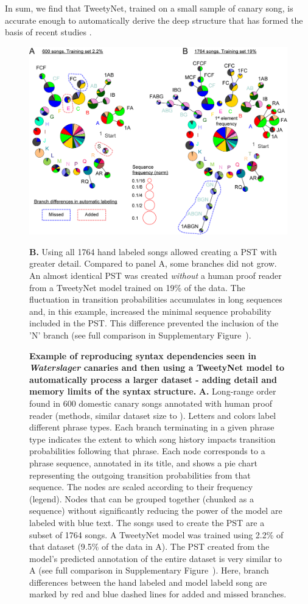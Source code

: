 \documentclass[10pt,letterpaper]{article}
\begin{document}
In sum, we find that TweetyNet, trained on a small sample of canary song, is accurate enough to automatically derive the deep structure that has formed the basis of recent studies \cite{markowitz_long-range_2013,cohen_hidden_2020}.


\begin{figure}[!ht]
\includegraphics[scale=0.85]{Figures/fig8/Figure8_v8.png}
\caption{{\bf Example of reproducing syntax dependencies seen in \textit{Waterslager} canaries and then using a TweetyNet model to automatically process a larger dataset - adding detail and memory limits of the syntax structure.}
\textbf{A.} Long-range order found in 600 domestic canary songs annotated with human proof reader (methods, similar dataset size to \cite{markowitz_long-range_2013}). Letters and colors label different phrase types. Each branch terminating in a given phrase type indicates the extent to which song history impacts transition probabilities following that phrase. Each node corresponds to a phrase sequence, annotated in its title, and shows a pie chart representing the outgoing transition probabilities from that sequence. The nodes are scaled according to their frequency (legend). Nodes that can be grouped together (chunked as a sequence) without significantly reducing the power of the model are labeled with blue text. The songs used to create the PST are a subset of 1764 songs. A TweetyNet model was trained using 2.2\% of that dataset (9.5\% of the data in A). The PST created from the model's predicted annotation of the entire dataset is very similar to A (see full comparison in Supplementary Figure~). Here, branch differences between the hand labeled and model labeld song are marked by red and blue dashed lines for added and missed branches.}
\textbf{B.} Using all 1764 hand labeled songs allowed creating a PST with greater detail. Compared to panel A, some branches did not grow. An almost identical PST was created \textit{without} a human proof reader from a TweetyNet model trained on 19\% of the data. The fluctuation in transition probabilities accumulates in long sequences and, in this example, increased the minimal sequence probability included in the PST. This difference prevented the inclusion of the 'N' branch (see full comparison in Supplementary Figure~).
\label{fig8}
\end{figure}
\end{document}
